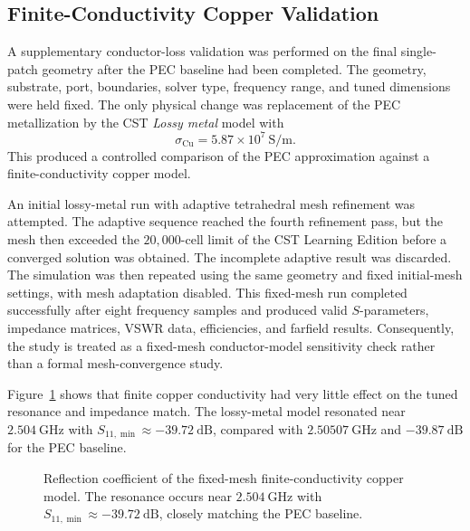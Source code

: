 \subsection{Finite-Conductivity Copper Validation}
\label{subsec:single-patch-copper-validation}

A supplementary conductor-loss validation was performed on the final single-patch geometry after the
PEC baseline had been completed. The geometry, substrate, port, boundaries, solver type, frequency
range, and tuned dimensions were held fixed. The only physical change was replacement of the PEC
metallization by the CST \emph{Lossy metal} model with
\[
\sigma_{\mathrm{Cu}}=5.87\times10^7~\mathrm{S/m}.
\]
This produced a controlled comparison of the PEC approximation against a finite-conductivity copper
model.

An initial lossy-metal run with adaptive tetrahedral mesh refinement was attempted. The adaptive
sequence reached the fourth refinement pass, but the mesh then exceeded the
\(20{,}000\)-cell limit of the CST Learning Edition before a converged solution was obtained. The
incomplete adaptive result was discarded. The simulation was then repeated using the same geometry and fixed initial-mesh settings, with mesh adaptation disabled. This fixed-mesh run completed successfully after eight
frequency samples and produced valid \(S\)-parameters, impedance matrices, VSWR data, efficiencies,
and farfield results. Consequently, the study is treated as a fixed-mesh conductor-model sensitivity
check rather than a formal mesh-convergence study.

Figure~\ref{fig:single-patch-copper-s11} shows that finite copper conductivity had very little effect on
the tuned resonance and impedance match. The lossy-metal model resonated near
\(2.504~\mathrm{GHz}\) with
\(S_{11,\min}\approx-39.72~\mathrm{dB}\), compared with
\(2.50507~\mathrm{GHz}\) and \(-39.87~\mathrm{dB}\) for the PEC baseline.

\begin{figure}[H]
    \centering
    \caption[Finite-conductivity single-patch reflection coefficient.]{Reflection coefficient of the fixed-mesh finite-conductivity copper model. The resonance occurs near \(2.504~\mathrm{GHz}\) with \(S_{11,\min}\approx-39.72~\mathrm{dB}\), closely matching the PEC baseline.}
    \label{fig:single-patch-copper-s11}
\end{figure}

